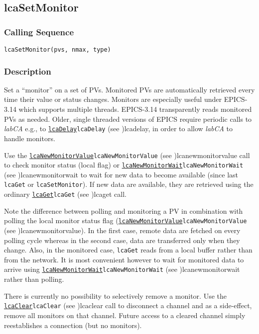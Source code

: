 \documentclass{article}
\newcommand{\sca}{\ita{labCA}}
\newcommand{\com}[1]{{\tt #1}}
\newcommand{\pbrk}{\pagebreak[3]}
\newcommand{\comref}[2]{\hyperref[ref]{\com{#1}}{\com{#1} (see }{)}{#2}}
\newcommand{\ita}[1]{\emph{#1}}
\renewcommand{\pbrk}{}
\begin{document}
\pbrk
\subsection{lcaSetMonitor}
\label{lcasetmonitor}
\subsubsection{Calling Sequence}
\begin{verbatim}
lcaSetMonitor(pvs, nmax, type)
\end{verbatim}
\subsubsection{Description}
Set a ``monitor'' on a set of PVs. Monitored PVs are automatically retrieved
every time their value or status changes. 
Monitors are especially useful under EPICS-3.14 which supports
multiple threads. EPICS-3.14 transparently reads monitored PVs as needed.
Older, single threaded versions of EPICS require periodic calls to \sca{}
e.g., to \comref{lcaDelay}{lcadelay}, in order to allow \sca{} to handle
monitors.

Use the \comref{lcaNewMonitorValue}{lcanewmonitorvalue} call to check
monitor status (local flag) or \comref{lcaNewMonitorWait}{lcanewmonitorwait}
to wait for new data to become available (since last \com{lcaGet} or \com{lcaSetMonitor}).
If new data are available, they are retrieved using
the ordinary \comref{lcaGet}{lcaget} call.

Note the difference between polling and monitoring a PV in combination with
polling the local monitor status flag (\comref{lcaNewMonitorValue}{lcanewmonitorvalue}).
In the first case, remote data are fetched
on every polling cycle whereas in the second case, data are transferred only
when they change.  Also, in the monitored case, \com{lcaGet} reads from a local
buffer rather than from the network. It is most convenient however to wait
for monitored data to arrive using \comref{lcaNewMonitorWait}{lcanewmonitorwait}
rather than polling.

There is currently no possibility to selectively remove a monitor. Use
the \comref{lcaClear}{lcaclear} call to disconnect a channel and as a side-effect,
remove all monitors on that channel. Future access to a cleared channel
simply reestablishes a connection (but no monitors).
\end{document}
